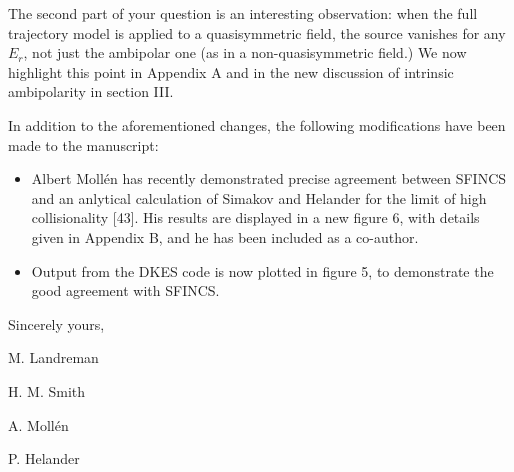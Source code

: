 \documentclass[11pt]{article}
\newcommand{\todo}[1]{{\color{red}#1}}
\begin{document}
The second part of your question is an interesting observation: when the full trajectory model
is applied to a quasisymmetric field, the source vanishes for any $E_r$, not just the ambipolar one (as in a non-quasisymmetric field.)
We now highlight this point in Appendix A and in \todo{the new discussion of intrinsic ambipolarity in section III.}

\vspace{0.3in}


In addition to the aforementioned changes, the following modifications have been made to the manuscript:

\begin{itemize}
\item Albert Moll\'{e}n has recently demonstrated precise agreement between SFINCS and an anlytical calculation
of Simakov and Helander for the limit of high collisionality [43]. His results are displayed in a new figure 6, with details given in Appendix B,
 and he has been included as a co-author.
\item Output from the DKES code is now plotted in figure 5, to demonstrate the good agreement with SFINCS.
\end{itemize}


Sincerely yours,\newline

M. Landreman

H. M. Smith

A. Moll\'{e}n

P. Helander
\end{document}
